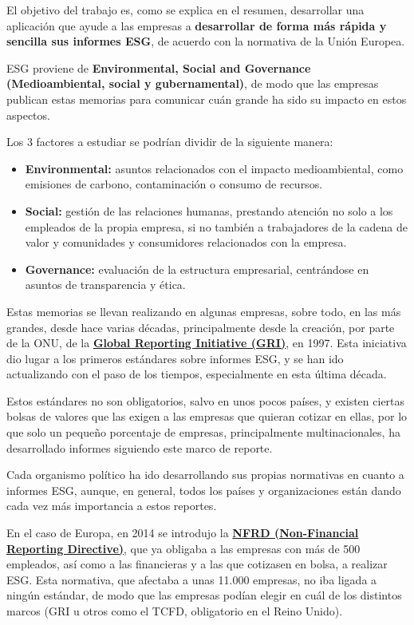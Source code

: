 
El objetivo del trabajo es, como se explica en el resumen, desarrollar una aplicación que ayude a las empresas a \textbf{desarrollar de forma más rápida y sencilla sus informes ESG}, de acuerdo con la normativa de la Unión Europea.

ESG proviene de \textbf{Environmental, Social and Governance (Medioambiental, social y gubernamental)}, de modo que las empresas publican estas memorias para comunicar cuán grande ha sido su impacto en estos aspectos. 

Los 3 factores a estudiar se podrían dividir de la siguiente manera:

\begin{itemize}
    \item \textbf{Environmental:} asuntos relacionados con el impacto medioambiental, como emisiones de carbono, contaminación o consumo de recursos.
    \item \textbf{Social:} gestión de las relaciones humanas, prestando atención no solo a los empleados de la propia empresa, si no también a trabajadores de la cadena de valor y comunidades y consumidores relacionados con la empresa.
    \item \textbf{Governance:} evaluación de la estructura empresarial, centrándose en asuntos de transparencia y ética.
\end{itemize}

Estas memorias se llevan realizando en algunas empresas, sobre todo, en las más grandes, desde hace varias décadas, principalmente desde la creación, por parte de la ONU, de la \href{https://www.globalreporting.org/}{\textbf{Global Reporting Initiative (GRI)}}, en 1997. Esta iniciativa dio lugar a los primeros estándares sobre informes ESG, y se han ido actualizando con el paso de los tiempos, especialmente en esta última década.

Estos estándares no son obligatorios, salvo en unos pocos países, y existen ciertas bolsas de valores que las exigen a las empresas que quieran cotizar en ellas, por lo que solo un pequeño porcentaje de empresas, principalmente multinacionales, ha desarrollado informes siguiendo este marco de reporte.  

Cada organismo político ha ido desarrollando sus propias normativas en cuanto a informes ESG, aunque, en general, todos los países y organizaciones están dando cada vez más importancia a estos reportes.

En el caso de Europa, en 2014 se introdujo la \href{https://eur-lex.europa.eu/eli/dir/2014/95/oj/eng}{\textbf{NFRD (Non-Financial Reporting Directive)}}, que ya obligaba a las empresas con más de 500 empleados, así como a las financieras y a las que cotizasen en bolsa, a realizar ESG. Esta normativa, que afectaba a unas 11.000 empresas, no iba ligada a ningún estándar, de modo que las empresas podían elegir en cuál de los distintos marcos (GRI u otros como el TCFD, obligatorio en el Reino Unido).

